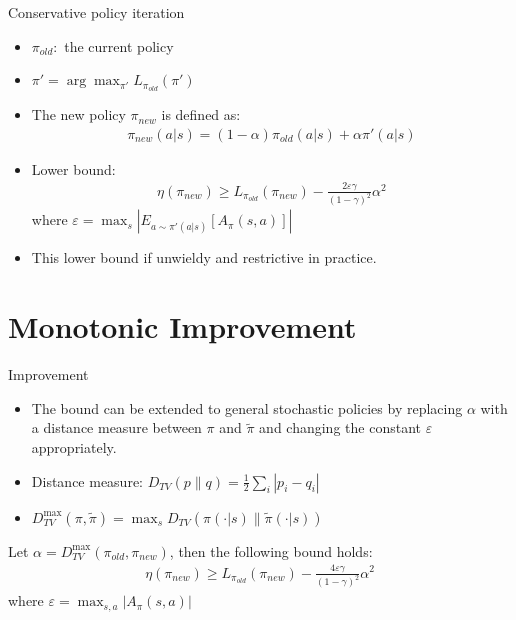 \documentclass[mathserif]{beamer}
\begin{document}
\begin{frame}[t]{Conservative policy iteration}
  \begin{itemize}
    \item $\pi_{old}:$ the current policy
    \item $\pi'=\arg\max_{\pi'}L_{\pi_{old}}(\pi')$
    \item The new policy $\pi_{new}$ is defined as:
    \begin{align}
      \pi_{new}(a|s)=(1-\alpha)\pi_{old}(a|s)+\alpha\pi'(a|s)
    \end{align}
    \item Lower bound:
    \begin{align}
      \eta(\pi_{new})\ge L_{\pi_{old}}(\pi_{new})-\frac{2\varepsilon\gamma}{(1-\gamma)^{2}}\alpha^{2}
    \end{align}
    where $\varepsilon=\max_{s}|E_{a\sim\pi'(a|s)}[A_{\pi}(s,a)]|$
    \item This lower bound if unwieldy and restrictive in practice.
  \end{itemize}
\end{frame}

\section{Monotonic Improvement}
\begin{frame}[t]{Improvement}
\begin{itemize}
\item The bound can be extended to general stochastic policies by replacing $\alpha$ with a distance measure between $\pi$ and $\tilde{\pi}$ and changing the constant $\varepsilon$ appropriately.
\item Distance measure: $D_{TV}(p\parallel q)=\frac{1}{2}\sum_{i}|p_{i}-q_{i}|$
\item $D_{TV}^{\max}(\pi,\tilde{\pi})=\max_{s}D_{TV}(\pi(\cdot|s)\parallel\tilde{\pi}(\cdot|s))$
\end{itemize}
\begin{theorem}
Let $\alpha=D_{TV}^{\max}(\pi_{old},\pi_{new})$, then the following bound holds:
\begin{align}
  \eta(\pi_{new})\ge L_{\pi_{old}}(\pi_{new})-\frac{4\varepsilon\gamma}{(1-\gamma)^{2}}\alpha^{2}
\end{align}
where $\varepsilon=\max_{s,a}|A_{\pi}(s,a)|$
\end{theorem}
\end{frame}
\end{document}
